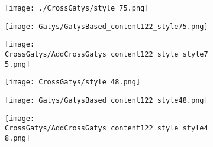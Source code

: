 \documentclass[runningheads]{llncs}
\begin{document}
\begin{figure}[!htbp]
  \centering
  \begin{subfigure}[b]{0.3\linewidth}
    \texttt{[image: ./CrossGatys/style\_75.png]}
  \end{subfigure}
  \begin{subfigure}[b]{0.3\linewidth}
    \texttt{[image: Gatys/GatysBased\_content122\_style75.png]}
  \end{subfigure}
  \begin{subfigure}[b]{0.3\linewidth}
    \texttt{[image: CrossGatys/AddCrossGatys\_content122\_style\_style75.png]}
  \end{subfigure}

  \begin{subfigure}[b]{0.3\linewidth}
    \texttt{[image: CrossGatys/style\_48.png]}
  \end{subfigure}
  \begin{subfigure}[b]{0.3\linewidth}
    \texttt{[image: Gatys/GatysBased\_content122\_style48.png]}
  \end{subfigure}
  \begin{subfigure}[b]{0.3\linewidth}
    \texttt{[image: CrossGatys/AddCrossGatys\_content122\_style\_style48.png]}
  \end{subfigure}


\end{figure}
\end{document}
